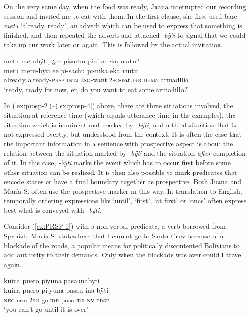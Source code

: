 On the very same day, when the food was ready, Juana interrupted our recording session and invited me to eat with them. In the first clause, she first used bare \textit{metu} ‘already, ready’, an adverb which can be used to express that something is finished, and then repeated the adverb and attached \textit{-bÿti} to signal that we could take up our work later on again. This is followed by the actual invitation.

\ea\label{ex:prosp-4}
\begingl
\glpreamble metu metubÿti, ¿ee pisachu pinika eka mutu?\\
\gla metu metu-bÿti ee pi-sachu pi-nika eka mutu\\
\glb already already-\textsc{prsp} \textsc{intj} 2\textsc{sg}-want 2\textsc{sg}-eat.\textsc{irr} \textsc{dem}a armadillo\\
\glft ‘ready, ready for now, er, do you want to eat some armadillo?’
\endgl
\trailingcitation{[jxx-p120430l-2.638-640]}
\xe
 

In (\ref{ex:prosp-2})–(\ref{ex:prosp-4}) above, there are three situations involved, the situation at reference time (which equals utterance time in the examples), the situation which is imminent and marked by \textit{-bÿti}, and a third situation that is not expressed overtly, but understood from the context. It is often the case that the important information in a sentence with prospective aspect is about the relation between the situation marked by \textit{-bÿti} and the situation \textit{after} completion of it. In this case, \textit{-bÿti} marks the event which has to occur first before some other situation can be realised. It is then also possible to mark predicates that encode states or have a final boundary together as prospective. Both Juana and María S. often use the prospective marker in this way. In translation to English, temporally ordering expressions like ‘until’, ‘first’, ‘at first’ or ‘once’ often express best what is conveyed with \textit{-bÿti}.

Consider (\ref{ex:PRSP-1}) with a non-verbal predicate, a verb borrowed from Spanish. María S. states here that I cannot go to Santa Cruz because of a blockade of the roads, a popular means for politically discontented Bolivians to add authority to their demands. Only when the blockade was over could I travel again.

\ea\label{ex:PRSP-1}
\begingl 
\glpreamble kuina puero piyuna pasaunabÿti\\
\gla kuina puero pi-yuna pasau-ina-bÿti\\ 
\glb \textsc{neg} can 2\textsc{sg}-go.\textsc{irr} pass-\textsc{irr.nv}-\textsc{prsp}\\ 
\glft ‘you can’t go until it is over’ \\ 
\endgl
\trailingcitation{[mrx-c120509l.109]}
\xe

